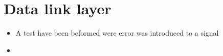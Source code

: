 \section{Data link layer}

\begin{itemize}
\item A test have been beformed were error was introduced to a signal
\item 
\end{itemize}